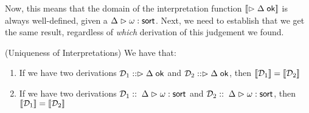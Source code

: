 Now, this means that the domain of the interpretation function
$[\![{\vartriangleright {\Delta} \;\mathsf{ok}}]\!]$ is always well-defined, given a ${{\Delta}} \vartriangleright {{\omega}} : {\mathsf{sort}}$. Next,
we need to establish that we get the same result, regardless of \emph{which} derivation
of this judgement we found. 

\begin{lemma}{(Uniqueness of Interpretations)}
We have that:
\begin{enumerate}
\item If we have two derivations $\mathcal{D}_1 :: \vartriangleright {\Delta} \;\mathsf{ok}$
      and $\mathcal{D}_2 :: \vartriangleright {\Delta} \;\mathsf{ok}$, 
      then $[\![{\mathcal{D}_1}]\!] = [\![{\mathcal{D}_2}]\!]$
\item If we have two derivations $\mathcal{D}_1 ::\; {{\Delta}} \vartriangleright {{\omega}} : {\mathsf{sort}}$
      and $\mathcal{D}_2 ::\; {{\Delta}} \vartriangleright {{\omega}} : {\mathsf{sort}}$, 
      then $[\![{\mathcal{D}_1}]\!] = [\![{\mathcal{D}_2}]\!]$
\end{enumerate}
\end{lemma}

